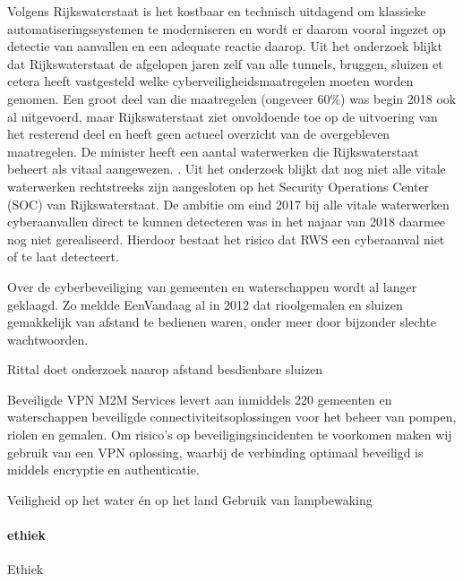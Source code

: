 \cite{kramerZeeland}
Volgens Rijkswaterstaat is het kostbaar en technisch uitdagend om klassieke automatiseringssystemen te moderniseren en wordt er daarom vooral ingezet op detectie van aanvallen en een adequate reactie daarop.
Uit het onderzoek blijkt dat Rijkswaterstaat de afgelopen jaren zelf van alle tunnels, bruggen, sluizen et cetera heeft vastgesteld welke cyberveiligheidsmaatregelen moeten worden genomen. Een groot deel van die maatregelen (ongeveer 60\%) was begin 2018 ook al uitgevoerd, maar Rijkswaterstaat ziet onvoldoende toe op de uitvoering van het resterend deel en heeft geen actueel overzicht van de overgebleven maatregelen.
De minister heeft een aantal waterwerken die Rijkswaterstaat beheert als vitaal aangewezen. . Uit het onderzoek blijkt dat nog niet alle vitale waterwerken rechtstreeks zijn aangesloten op het Security Operations Center (SOC) van Rijkswaterstaat. De ambitie om eind 2017 bij alle vitale waterwerken cyberaanvallen direct te kunnen detecteren was in het najaar van 2018 daarmee nog niet gerealiseerd. Hierdoor bestaat het risico dat RWS een cyberaanval niet of te laat detecteert.

\cite{cybersecWaterwerk}
Over de cyberbeveiliging van gemeenten en waterschappen wordt al langer geklaagd. Zo meldde EenVandaag al in 2012 dat rioolgemalen en sluizen gemakkelijk van afstand te bedienen waren, onder meer door bijzonder slechte wachtwoorden.

\cite{cybersecWaterschappen}
Rittal doet onderzoek naarop afstand besdienbare sluizen

\cite{cybersecZuidHolland}
Beveiligde VPN
M2M Services levert aan inmiddels 220 gemeenten en waterschappen beveiligde connectiviteitsoplossingen voor het beheer van pompen, riolen en gemalen. Om risico’s op beveiligingsincidenten te voorkomen maken wij gebruik van een VPN oplossing, waarbij de verbinding optimaal beveiligd is middels encryptie en authenticatie.

\cite{waterwerkNED}
Veiligheid op het water én op het land
Gebruik van lampbewaking 

\cite{veiligheidwaterland} 



\paragraph{ethiek}


Ethiek 



